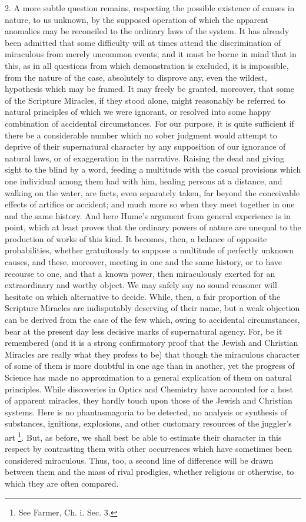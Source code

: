 2. A more subtle question remains, respecting the
possible existence of causes in nature, to us unknown, by the supposed
operation of which the apparent anomalies may be reconciled to the
ordinary laws of the system. It has already been admitted that some
difficulty will at times attend the discrimination of miraculous from
merely uncommon events; and it must be borne in mind that in this, as
in all questions from which demonstration is excluded, it is
impossible, from the nature of the case, absolutely to disprove any,
even the wildest, hypothesis which may be framed. It may freely be
granted, moreover, that some of the Scripture Miracles, if they stood
alone, might reasonably be referred to natural principles of which we
were ignorant, or resolved into some happy combination of accidental
circumstances. For our purpose, it is quite sufficient if there be a
considerable number which no sober judgment would attempt to deprive
of their supernatural character by any supposition of our ignorance of
natural laws, or of exaggeration in the narrative. Raising the dead
and giving sight to the blind by a word, feeding a multitude with the
casual provisions which one individual among them had with him,
healing persons at a distance, and walking on the water, are facts,
even separately taken, far beyond the conceivable effects of artifice
or accident; and much more so when they meet together in one and the
same history. And here Hume's argument from general experience is in
point, which at least proves that the ordinary powers of nature are
unequal to the production of works of this kind. It becomes, then, a
balance of opposite probabilities, whether gratuitously to suppose a
multitude of perfectly unknown causes, and these, moreover, meeting in
one and the same history, or to have recourse to one, and that a known
power, then miraculously exerted for an extraordinary and worthy
object. We may safely say no sound reasoner will hesitate on which
alternative to decide. While, then, a fair proportion of the Scripture
Miracles are indisputably deserving of their name, but a weak
objection can be derived from the case of the few which, owing to
accidental circumstances, bear at the present day less decisive marks
of supernatural agency. For, be it remembered (and it is a strong
confirmatory proof that the Jewish and Christian Miracles are really
what they profess to be) that though the miraculous character of some
of them is more doubtful in one age than in another, yet the progress
of Science has made no approximation to a general explication of them
on natural principles. While discoveries in Optics and Chemistry have
accounted for a host of apparent miracles, they hardly touch upon
those of the Jewish and Christian systems. Here is no phantasmagoria
to be detected, no analysis or synthesis of substances, ignitions,
explosions, and other customary resources of the juggler's art \footnote{See Farmer, Ch. i. Sec. 3.}. But, as before, we shall best be able to estimate their
character in this respect by contrasting them with other occurrences
which have sometimes been considered miraculous. Thus, too, a second
line of difference will be drawn between them and the mass of rival
prodigies, whether religious or otherwise, to which they are often
compared.

